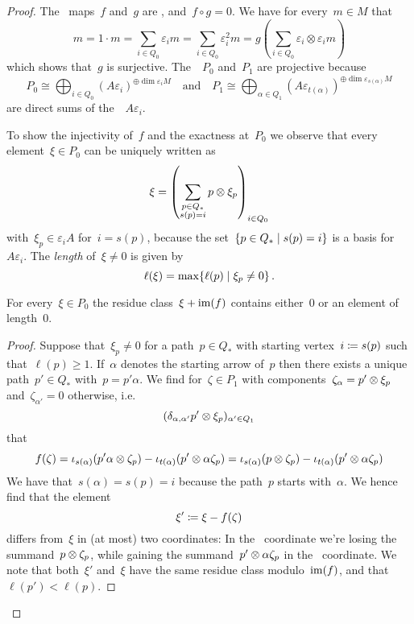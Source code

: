 \begin{proof}
  The~{\klin} maps~$f$ and~$g$ are {\welldef}, and~$f \circ g = 0$.
  We have for every~$m \in M$ that
  \[
    m
    =
    1 \cdot m
    =
    \sum_{i \in Q_0} \varepsilon_i m
    =
    \sum_{i \in Q_0} \varepsilon_i^2 m
    =
    g\left( \sum_{i \in Q_0} \varepsilon_i \otimes \varepsilon_i m \right)
  \]
  which shows that~$g$ is surjective.
  The~{}~$P_0$ and~$P_1$ are projective because
  \[
    P_0
    \cong
    \bigoplus_{i \in Q_0}
    (A \varepsilon_i)^{\oplus \dim \varepsilon_i M}
    \quad\text{and}\quad
    P_1
    \cong
    \bigoplus_{\alpha \in Q_1}
    (A \varepsilon_{t(\alpha)})^{\oplus \dim \varepsilon_{s(\alpha)} M}
  \]
  are direct sums of the~{}~$A \varepsilon_i$.
  
  To show the injectivity of~$f$ and the exactness at~$P_0$ we observe that every element~$\xi \in P_0$ can be uniquely written as
  \[
    \xi
    =
    \left(
      \sum_{\substack{p \in Q_* \\ s(p) = i}}
      p \otimes \xi_p
    \right)_{i \in Q_0}
  \]
  with~$\xi_p \in \varepsilon_i A$ for~$i = s(p)$, because the set~$\{ p \in Q_* \suchthat s(p) = i \}$ is a basis for~$A \varepsilon_i$.
  The \emph{length} of~$\xi \neq 0$ is given by
  \[
      \ell(\xi)
    = \max
      \{
        \ell(p)
      \suchthat
        \xi_p \neq 0
      \}  \,.
  \]
  
  \begin{claimnonum}
    For every~$\xi \in P_0$ the residue class~$\xi + \operatorname{im}(f)$ contains either~$0$ or an element of length~$0$.
  \end{claimnonum}
  
  \begin{proof}
    Suppose that~$\xi_p \neq 0$ for a path~$p \in Q_*$ with starting vertex~$i \coloneqq s(p)$ such that~$\ell(p) \geq 1$.
    If~$\alpha$ denotes the starting arrow of~$p$ then there exists a unique path~$p' \in Q_*$ with~$p = p' \alpha$.
    We find for~$\zeta \in P_1$ with components~$\zeta_\alpha = p' \otimes \xi_p$ and~$\zeta_{\alpha'} = 0$ otherwise, i.e.
    \[
      ( \delta_{\alpha, \alpha'} p' \otimes \xi_p )_{\alpha' \in Q_1}
    \]
    that
    \[
      f( \zeta )
      =
        \iota_{s(\alpha)}(p' \alpha \otimes \zeta_p)
      - \iota_{t(\alpha)}(p' \otimes \alpha \zeta_p)
      =
        \iota_{s(\alpha)}(p \otimes \zeta_p)
      - \iota_{t(\alpha)}(p' \otimes \alpha \zeta_p)
    \]
    We have that~$s(\alpha) = s(p) = i$ because the path~$p$ starts with~$\alpha$.
    We hence find that the element
    \[
      \xi'
      \coloneqq
      \xi - f(\zeta)
    \]
    differs from~$\xi$ in (at most) two coordinates:
    In the~ coordinate we’re losing the summand~$p \otimes \zeta_p$, while gaining the summand~$p' \otimes \alpha \zeta_p$ in the~ coordinate.
    We note that both~$\xi'$ and~$\xi$ have the same residue class modulo~$\operatorname{im}(f)$, and that~$\ell(p') < \ell(p)$.
    

\end{proof}
\end{proof}
